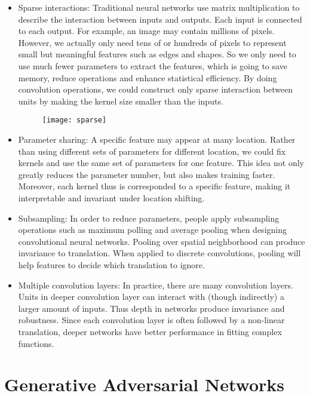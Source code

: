 \begin{itemize}
\item Sparse interactions: Traditional neural networks use matrix multiplication to describe the interaction between inputs and outputs. Each input is connected to each output. For example, an image may contain millions of pixels. However, we actually only need tens of or hundreds of pixels to represent small but meaningful features such as edges and shapes. So we only need to use much fewer parameters to extract the features, which is going to save memory, reduce operations and enhance statistical efficiency. By doing convolution operations, we could construct only sparse interaction between units by making the kernel size smaller than the inputs.
\begin{figure}
	\centering
	\texttt{[image: sparse]}
	\label{fig:5}
\end{figure}
\item Parameter sharing: A specific feature may appear at many location. Rather than using different sets of parameters for different location, we could fix kernels and use the same set of parameters for one feature. This idea not only greatly reduces the parameter number, but also makes training faster. Moreover, each kernel thus is corresponded to a specific feature, making it interpretable and invariant under location shifting.

\item Subsampling: In order to reduce parameters, people apply subsampling operations such as maximum polling and average pooling when designing convolutional neural networks. Pooling over spatial neighborhood can produce invariance to translation. When applied to discrete convolutions, pooling will help features to decide which translation to ignore.

\item Multiple convolution layers: In practice, there are many convolution layers. Units in deeper convolution layer can interact with (though indirectly) a larger amount of inputs. Thus depth in networks produce invariance and robustness. Since each convolution layer is often followed by a non-linear translation, deeper networks have better performance in fitting complex functions.
\end{itemize}

\section{Generative Adversarial Networks}

